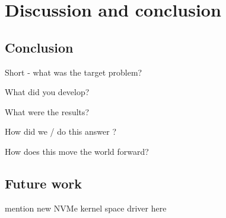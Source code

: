 \chapter{Discussion and conclusion}\label{chapter:conclusion}
\section{Conclusion}\label{sec:concl}



Short - what was the target problem?


What did you develop?

What were the results?

How did we / do this answer ?

How does this move the world forward?

\section{Future work}\label{sec:fw}
mention new NVMe kernel space driver here

